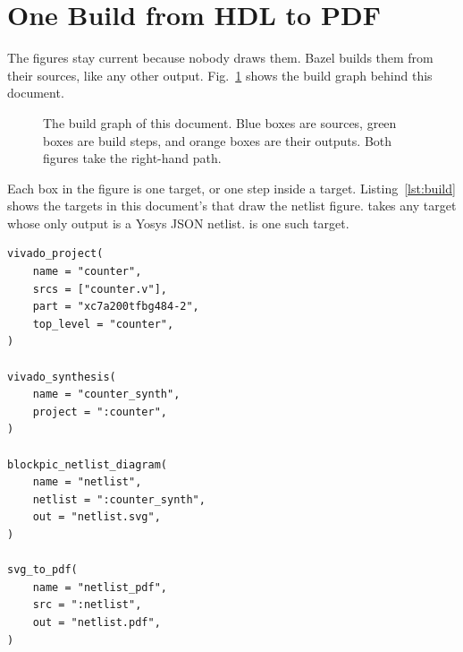 \section{One Build from HDL to PDF}
\label{sec:build}

The figures stay current because nobody draws them. Bazel \cite{bazel}
builds them from their sources, like any other output. Fig.~\ref{fig:graph}
shows the build graph behind this document.

\begin{figure}[!tb]
\centering
{}
\caption{The build graph of this document. Blue boxes are sources, green
boxes are build steps, and orange boxes are their outputs. Both figures
take the right-hand path.}
\label{fig:graph}
\end{figure}

Each box in the figure is one target, or one step inside a target.
Listing~\ref{lst:build} shows the targets in this document's
 that draw the netlist figure.
 takes any target whose only output is a
Yosys JSON netlist.  is one such target.

\begin{lstlisting}[style=bzl,float=t,caption={The targets that draw
Fig.~\ref{fig:netlist}.},label={lst:build}]
vivado_project(
    name = "counter",
    srcs = ["counter.v"],
    part = "xc7a200tfbg484-2",
    top_level = "counter",
)

vivado_synthesis(
    name = "counter_synth",
    project = ":counter",
)

blockpic_netlist_diagram(
    name = "netlist",
    netlist = ":counter_synth",
    out = "netlist.svg",
)

svg_to_pdf(
    name = "netlist_pdf",
    src = ":netlist",
    out = "netlist.pdf",
)
\end{lstlisting}

